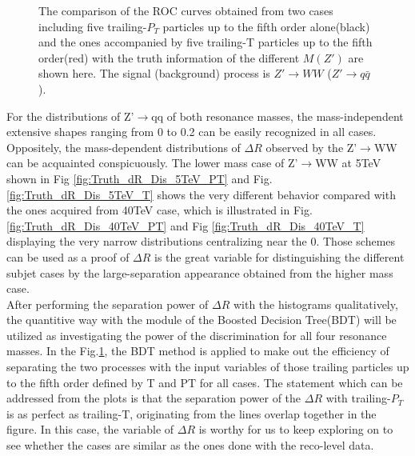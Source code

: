 \begin{figure}
\begin{center}
\end{center}
\caption{The comparison of the ROC curves obtained from two cases including five trailing-$P_{T}$ particles up to the fifth order alone(black) and the ones accompanied by five trailing-T particles up to the fifth order(red) with  the truth information of the different $M(Z')$ are shown here. The signal (background) process is $Z'\rightarrow WW$ ($Z' \rightarrow q\bar{q}$).\label{fig:Truth_dR_BDT}}
\end{figure}


For the distributions of Z'$\rightarrow$qq of both resonance masses, the mass-independent extensive shapes ranging from 0 to 0.2 can be easily recognized in all cases. Oppositely, the mass-dependent distributions of $\Delta R$ observed by the Z'$\rightarrow$WW can be acquainted conspicuously. The lower mass case of Z'$\rightarrow$WW at 5TeV shown in Fig \ref{fig:Truth_dR_Dis_5TeV_PT} and Fig.\ref{fig:Truth_dR_Dis_5TeV_T} shows the very different behavior compared with the ones acquired from 40TeV case, which is illustrated in Fig.\ref{fig:Truth_dR_Dis_40TeV_PT} and Fig \ref{fig:Truth_dR_Dis_40TeV_T} displaying the very narrow distributions centralizing near the 0. Those schemes can be used as a proof of $\Delta R$ is the great variable for distinguishing the different subjet cases by the large-separation appearance obtained from the higher mass case. \\

After performing the separation power of $\Delta R$ with the histograms qualitatively, the quantitive way with the module of the Boosted Decision Tree(BDT) will be utilized as investigating the power of the discrimination for all four resonance masses. In the Fig.\ref{fig:Truth_dR_BDT}, the BDT method is applied to make out the efficiency of separating the two processes with the input variables of those trailing particles up to the fifth order defined by T and PT for all cases. The statement which can be addressed from the plots is that the separation power of the $\Delta R$ with trailing-$P_{T}$ is as perfect as trailing-T, originating from the lines overlap together in the figure. In this case, the variable of $\Delta R$ is worthy for us to keep exploring on to see whether the cases are similar as the ones done with the reco-level data.\\

